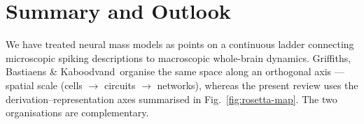 \documentclass[12pt]{article}
\numberwithin{equation}{section}
\newcommand{\rev}[1]{\begingroup\color{navyblue}#1\endgroup}
\begin{document}




\clearpage \section{Summary and Outlook}


\label{sec:Closing}


\rev{We have treated neural mass models as points on a continuous ladder connecting microscopic spiking descriptions to macroscopic whole-brain dynamics. Griffiths, Bastiaens \& Kaboodvand~\cite{griffiths_bastiaens_kaboodvand_2021}organise the same space along an orthogonal axis --- spatial scale (cells $\to$ circuits $\to$ networks), whereas the present review uses the derivation--representation axes \rev{summarised in Fig.~\ref{fig:rosetta-map}}. The two organisations are complementary.}
\end{document}
